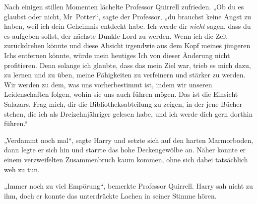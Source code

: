 Nach einigen stillen Momenten lächelte Professor Quirrell zufrieden.
„Ob du es glaubst oder nicht, Mr~Potter“, sagte der Professor,
„du brauchst keine Angst zu haben, weil ich dein Geheimnis entdeckt habe. Ich werde dir \emph{nicht} sagen, dass du es aufgeben sollst, der nächste Dunkle Lord zu werden. Wenn ich die Zeit zurückdrehen könnte und diese Absicht irgendwie aus dem Kopf meines jüngeren Ichs entfernen könnte, würde mein heutiges Ich von dieser Änderung nicht profitieren. Denn solange ich glaubte, dass das mein Ziel war, trieb es mich dazu, zu lernen und zu üben, meine Fähigkeiten zu verfeinern und stärker zu werden. Wir werden zu dem, was uns vorherbestimmt ist, indem wir unseren Leidenschaften folgen, wohin sie uns auch führen mögen. Das ist die Einsicht Salazars. Frag mich, dir die Bibliotheksabteilung zu zeigen, in der jene Bücher stehen, die ich als Dreizehnjähriger gelesen habe, und ich werde dich gern dorthin führen.“

„Verdammt noch mal“, sagte Harry und setzte sich auf den harten Marmorboden, dann legte er sich hin und starrte das hohe Deckengewölbe an. Näher konnte er einem verzweifelten Zusammenbruch kaum kommen, ohne sich dabei tatsächlich weh zu tun.

„Immer noch zu viel Empörung“, bemerkte Professor Quirrell. Harry sah nicht zu ihm, doch er konnte das unterdrückte Lachen in seiner Stimme hören.

